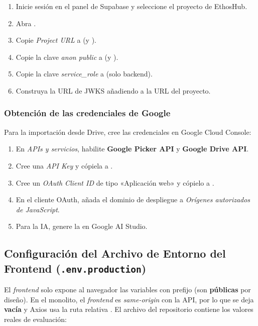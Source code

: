 \begin{enumerate}[noitemsep]
    \item Inicie sesión en el panel de Supabase y seleccione el proyecto de EthosHub.
    \item Abra .
    \item Copie \textit{Project URL} a  (y ).
    \item Copie la clave \textit{anon public} a  (y ).
    \item Copie la clave \textit{service\_role} a  (solo backend).
    \item Construya la URL de JWKS añadiendo  a la URL del proyecto.
\end{enumerate}

\subsubsection{Obtención de las credenciales de Google}
Para la importación desde Drive, cree las credenciales en Google Cloud Console:\par
\begin{enumerate}[noitemsep]
    \item En \textit{APIs y servicios}, habilite \textbf{Google Picker API} y \textbf{Google Drive API}.
    \item Cree una \textit{API Key} y cópiela a .
    \item Cree un \textit{OAuth Client ID} de tipo «Aplicación web» y cópielo a .
    \item En el cliente OAuth, añada el dominio de despliegue a \textit{Orígenes autorizados de JavaScript}.
    \item Para la IA, genere la  en Google AI Studio.
\end{enumerate}

\subsection{Configuración del Archivo de Entorno del Frontend (\texttt{.env.production})}%
\label{subsec:env-frontend}

El \textit{frontend} solo expone al navegador las variables con prefijo 
(son \textbf{públicas} por diseño). En el monolito, el \textit{frontend} es
\textit{same-origin} con la API, por lo que  se deja \textbf{vacía}
y Axios usa la ruta relativa . El archivo  del
repositorio contiene los valores reales de evaluación:\par

